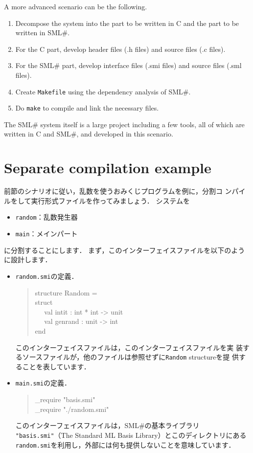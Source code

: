 \documentclass{jbook}
\newif\ifjp
\newcommand{\txt}[2]{#2}
\newcommand{\smlsharp}{SML\#}
\newcommand{\myem}{\mbox{\ \ }}
\newenvironment{program}{\begin{quote}\begin{tt}}%
                        {\end{tt}\end{quote}}
\begin{document}
	A more advanced scenario can be the following.
\begin{enumerate}
\item Decompose the system into the part to be written in C and the part
to be written in \smlsharp{}.
\item For the C part, develop header files (.h files) and source files
(.c files). 
\item For the \smlsharp{} part, develop interface files (.smi files)
and source files (.sml files).
\item Create {\tt Makefile} using the dependency analysis of \smlsharp{}.
\item Do {\tt make} to compile and link the necessary files.
\end{enumerate}
	The \smlsharp{} system itself is a large project including a few
tools, all of which are written in C and \smlsharp{}, and developed in
this scenario.
\fi%

\section{\txt{分割コンパイル例}{Separate compilation example}}
\label{sec:tutorialSeparateCompilationExample}

\ifjp%
	前節のシナリオに従い，乱数を使うおみくじプログラムを例に，分割コ
ンパイルをして実行形式ファイルを作ってみましょう．
	システムを
\begin{itemize}
\item {\tt random}：乱数発生器
\item {\tt main}：メインパート
\end{itemize}
に分割することにします．
	まず，このインターフェイスファイルを以下のように設計します．
\begin{itemize}
\item {\tt random.smi}の定義．
\begin{program}
structure Random =
\\
struct
\\\myem
  val intit : int * int -> unit
\\\myem
  val genrand : unit -> int
\\
end
\end{program}
	このインターフェイスファイルは，このインターフェイスファイルを実
装するソースファイルが，他のファイルは参照せずに{\tt Random} structureを提
供することを表しています．
\item {\tt main.smi}の定義．
\begin{program}
\_require "basis.smi"\\
\_require "./random.smi"
\end{program}
	このインターフェイスファイルは，\smlsharp{}の基本ライブラリ{\tt
"basis.smi"}（The Standard ML Basis Library）とこのディレクトリにある
{\tt random.smi}を利用し，外部には何も提供しないことを意味しています．
\end{itemize}
\end{document}
